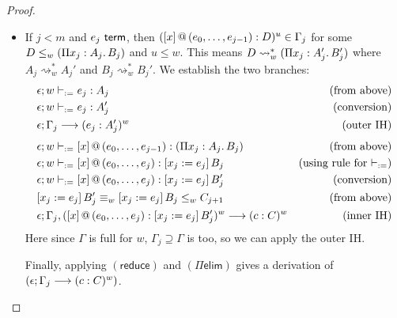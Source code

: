 \documentclass[twoside]{report}
\begin{document}
\begin{proof}
\begin{itemize}
\begin{itemize}
                  \item If $j < m$ and $e_j \ \mathsf{term}$, then $({[x]}\,@\,({e_0, \ldots, e_{j-1}}) : D)^u \in \Gamma_j$ for some $D \leq_w (\Pi{x_j} : {A_j}.\,{B_j})$ and $u\leq w$. This means $D \rightsquigarrow^\ast_w (\Pi{x_j} : {A_j'}.\,{B_j'})$ where $A_j \rightsquigarrow^\ast_w A_j'$ and $B_j \rightsquigarrow^\ast_w B_j'$. We establish the two branches:
                        $$
                            \begin{aligned}
                            & \epsilon; w \vdash_{:=} e_j : A_j & \text{(from above)} \\
                            & \epsilon; w \vdash_{:=} e_j : A_j' & \text{(conversion)} \\
                            & \epsilon; \Gamma_j \longrightarrow (e_j : A_j')^w & \text{(outer IH)} \\[0.3em]
                            & \epsilon; w \vdash_{:=} {[x]}\,@\,({e_0, \ldots, e_{j-1}}) : (\Pi{x_j} : {A_j}.\,{B_j}) & \text{(from above)} \\
                            & \epsilon; w \vdash_{:=} {[x]}\,@\,({e_0, \ldots, e_j}) : [{x_j}:={e_j}]\,{B}_j & \text{(using rule for $\vdash_{:=}$)} \\
                            & \epsilon; w \vdash_{:=} {[x]}\,@\,({e_0, \ldots, e_j}) : [{x_j}:={e_j}]\,{B}_j' & \text{(conversion)} \\
                            & [{x_j}:={e_j}]\,{B}_j' \equiv_w [{x_j}:={e_j}]\,{B}_j \leq_w C_{j+1} & \text{(from above)} \\
                            & \epsilon; \Gamma_j, ({[x]}\,@\,({e_0, \ldots, e_j}) : [{x_j}:={e_j}]\,{B}_j')^w \longrightarrow (c : C)^w & \text{(inner IH)} \\
                            \end{aligned}
                        $$
                        Here since $\Gamma$ is full for $w$, $\Gamma_j \supseteq \Gamma$ is too, so we can apply the outer IH.

                        Finally, applying $(\mathsf{reduce})$ and $(\Pi\mathsf{elim})$ gives a derivation of $(\epsilon; \Gamma_j \longrightarrow (c : C)^w)$.


\end{itemize}
\end{itemize}
\end{proof}
\end{document}
